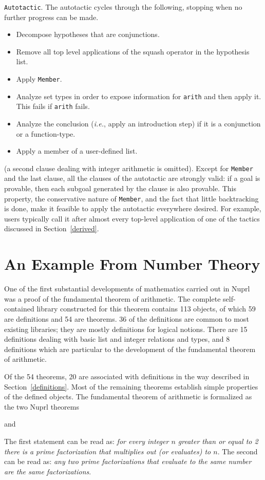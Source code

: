 {\tt Autotactic}.  The autotactic cycles through the following, stopping when
no further progress can be made.
\begin{itemize}
\item Decompose hypotheses that are conjunctions.
\item Remove all top level applications of the squash operator in the hypothesis
list.
\item Apply {\tt Member}.
\item Analyze set types in order to expose information for {\tt arith} and
then apply it.  This fails if {\tt arith} fails.
\item Analyze the conclusion ({\em i.e.}, apply an introduction step) if it is a
conjunction or a function-type.
\item Apply a member of a user-defined list.
\end{itemize}
(a second clause dealing with integer arithmetic is omitted).
Except for {\tt Member} and the last clause, all the clauses of the
autotactic are strongly
valid: if a goal is provable, then each subgoal generated by the clause is also
provable.  This property, the conservative nature of {\tt Member}, and the
fact that little backtracking is done, make it feasible to apply the autotactic
everywhere desired.  For example, users typically call it after almost every
top-level application 
of one of the tactics discussed in Section~\ref{derived}.

\section{An Example From Number Theory}

One of the first substantial developments of mathematics carried out in Nuprl
was a proof of the fundamental theorem of arithmetic.  The complete
self-contained library constructed for this theorem contains 113 objects, of
which 59 are definitions and 54 are theorems.  36 of the definitions are
common to most existing libraries; they are mostly definitions for logical
notions.  There are 15 definitions dealing with
basic list and integer relations and types, and 8 definitions which are 
particular to the development of the fundamental theorem of arithmetic.

Of the 54 theorems, 20 are associated with definitions in the way described
in Section~\ref{definitions}.
Most of the remaining theorems establish simple properties of the defined
objects.  The fundamental theorem of arithmetic is formalized
as the two Nuprl theorems
\begin{Numath}
\end{Numath}%
and
\begin{Numath}
\end{Numath}%
The first statement can be
read as: {\em for every integer $n$ greater than or equal to 2 there is a prime
factorization that multiplies out (or {\em evaluates}) to $n$}.  The second
can be read as: {\em any two prime factorizations that evaluate to the same
number are the
same factorizations}.  

